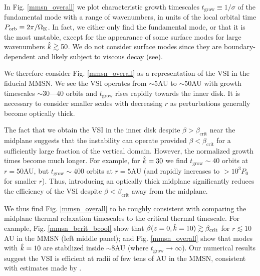 In Fig. \ref{mmsn_overall} we plot characteristic growth timescales
$t_\mathrm{grow} \equiv 1/\sigma$ of the fundamental mode with a range of
wavenumbers, in units of the local orbital time $P_\mathrm{orb}\equiv
2\pi/\Omega_{\rm K}$. In fact, we either only find the fundamental mode, or 
that it is the most unstable, except for the appearance of some 
surface modes for large wavenumbers $\hat{k}\gtrsim 50$. We do not
consider surface modes since they are boundary-dependent and likely
subject to viscous decay (see). 

We therefore consider Fig. \ref{mmsn_overall} as a representation of the
VSI in the fiducial MMSN. We see the VSI operates from $\sim 5$AU to $\sim
50$AU with growth timescales $\sim 30$---40 orbits and
$t_\mathrm{grow}$ rises rapidly towards the inner disk. It is
necessary to consider smaller scales with decreasing $r$ as
perturbations generally become optically thick.   

The fact that we obtain the VSI in the inner disk despite $\beta >
\beta_\mathrm{crit}$ near the midplane suggests that the instability
can operate provided $\beta < \beta_\mathrm{crit}$ for a sufficiently large
fraction of the vertical domain. However, the normalized growth times
become much longer. For example, for $\hat{k}=30$ we find
$t_\mathrm{grow}\sim 40$ orbits at $r=50$AU, but $t_\mathrm{grow}\sim
400$ orbits at $r=5$AU (and rapidly increases to $> 10^3P_0$ for
smaller $r$). Thus, introducing an optically thick midplane
significantly reduces the efficiency of the VSI despite $\beta <
\beta_\mathrm{crit}$ away from the midplane. 


We thus find Fig. \ref{mmsn_overall} to be roughly consistent with
comparing the midplane thermal relaxation timescales to the critical
thermal timescale. For example, 
Fig. \ref{mmsn_bcrit_bcool} show that $\beta(z=0,\hat{k}=10) \gtrsim
\beta_\mathrm{crit}$ for $r\lesssim 10$AU in the MMSN (left middle
panel); and Fig. \ref{mmsn_overall} 
show that modes with $\hat{k}=10$ are stabilized inside $\sim 8$AU (where
$t_\mathrm{grow}\to\infty$). Our numerical results suggest the VSI
is efficient at radii of few tens of AU in the MMSN, consistent with
estimates made by . 

